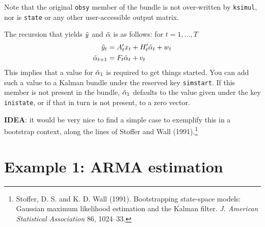 \documentclass[a4paper]{article}
\begin{document}
Note that the original \texttt{obsy} member of the bundle is not
over-written by \texttt{ksimul}, nor is \texttt{state} or any other
user-accessible output matrix.

The recursion that yields $\tilde{y}$ and $\tilde{\alpha}$
is as follows: for $t=1,\dots,T$
%
\begin{align*}
  \tilde{y}_t &= A_t'x_t + 
   H_t' \tilde{\alpha}_t + w_t  \\ 
  \tilde{\alpha}_{t+1} &= F_t \tilde{\alpha}_t + v_t
\end{align*}
%
This implies that a value for $\tilde{\alpha}_1$ is required to get
things started. You can add such a value to a Kalman bundle under the
reserved key \texttt{simstart}. If this member is not present in the
bundle, $\tilde{\alpha}_1$ defaults to the value given under the
key \texttt{inistate}, or if that in turn is not present, to a zero
vector.


\textbf{IDEA}: it would be very nice to find a simple case to
exemplify this in a bootstrap context, along the lines of Stoffer and
Wall (1991).\footnote{Stoffer, D. S. and K. D. Wall
  (1991). Bootstrapping state-space models: Gaussian maximum
  likelihood estimation and the Kalman filter. \emph{J. American
    Statistical Association} 86, 1024--33.}

\section{Example 1: ARMA estimation}
\label{sec:example_arma}
\end{document}
